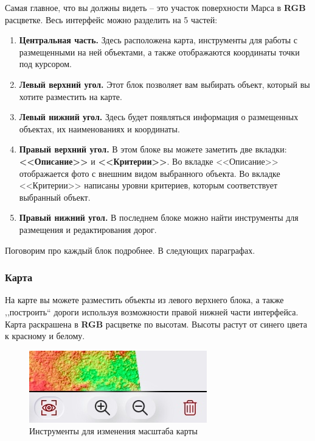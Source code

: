 Самая главное, что вы должны видеть -- это участок поверхности Марса в \textbf{RGB} расцветке. Весь интерфейс можно разделить на 5 частей:

\begin{enumerate}
	\item \textbf{Центральная часть.} Здесь расположена карта,  инструменты для работы с размещенными на ней объектами, а также отображаются координаты точки под курсором.
	\item \textbf{Левый верхний угол.} Этот блок позволяет вам выбирать объект, который вы хотите разместить на карте.
	\item \textbf{Левый нижний угол.} Здесь будет появляться информация о размещенных объектах, их наименованиях и координаты.
	\item \textbf{Правый верхний угол.} В этом блоке вы можете заметить две вкладки: \textbf{<<Описание>>} и \textbf{<<Критерии>>}. Во вкладке <<Описание>> отображается фото с внешним видом выбранного объекта. Во вкладке <<Критерии>> написаны уровни критериев, которым соответствует выбранный объект.
	\item \textbf{Правый нижний угол.} В последнем блоке можно найти инструменты для размещения и редактирования дорог.
\end{enumerate}

Поговорим про каждый блок подробнее. В следующих параграфах.

\subsubsection*{Карта}

На карте вы можете разместить объекты из левого верхнего блока, а также ,,построить`` дороги используя возможности правой нижней части интерфейса. Карта раскрашена в \textbf{RGB} расцветке по высотам. Высоты растут от синего цвета к красному и белому.

\begin{figure}
	\centering
	\includegraphics[width=.9\linewidth]{./img/zoom}
	\caption{Инструменты для изменения масштаба карты}\label{fig:zoom}
\end{figure}

